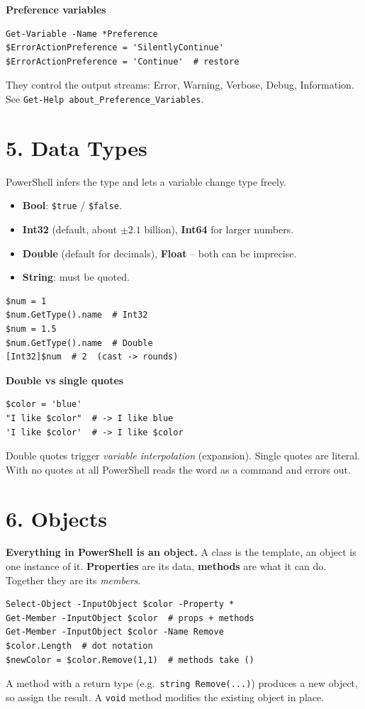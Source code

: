 \textbf{Preference variables}

\begin{verbatim}
Get-Variable -Name *Preference
$ErrorActionPreference = 'SilentlyContinue'
$ErrorActionPreference = 'Continue'  # restore
\end{verbatim}
They control the output streams: Error, Warning, Verbose, Debug, Information.
See \texttt{Get-Help about\_Preference\_Variables}.

\section{5. Data Types}
PowerShell infers the type and lets a variable change type freely.
\begin{itemize}
\item \textbf{Bool}: \texttt{\$true} / \texttt{\$false}.
\item \textbf{Int32} (default, about $\pm 2.1$ billion), \textbf{Int64} for larger numbers.
\item \textbf{Double} (default for decimals), \textbf{Float} -- both can be imprecise.
\item \textbf{String}: must be quoted.
\end{itemize}
\begin{verbatim}
$num = 1
$num.GetType().name  # Int32
$num = 1.5
$num.GetType().name  # Double
[Int32]$num  # 2  (cast -> rounds)
\end{verbatim}

\textbf{Double vs single quotes}

\begin{verbatim}
$color = 'blue'
"I like $color"  # -> I like blue
'I like $color'  # -> I like $color
\end{verbatim}
Double quotes trigger \emph{variable interpolation} (expansion). Single quotes are literal.
With no quotes at all PowerShell reads the word as a command and errors out.

\section{6. Objects}
\textbf{Everything in PowerShell is an object.}
A class is the template, an object is one instance of it.
\textbf{Properties} are its data, \textbf{methods} are what it can do. Together they are its \emph{members}.
\begin{verbatim}
Select-Object -InputObject $color -Property *
Get-Member -InputObject $color  # props + methods
Get-Member -InputObject $color -Name Remove
$color.Length  # dot notation
$newColor = $color.Remove(1,1)  # methods take ()
\end{verbatim}
A method with a return type (e.g.\ \texttt{string Remove(...)}) produces a new object, so assign the result.
A \texttt{void} method modifies the existing object in place.

